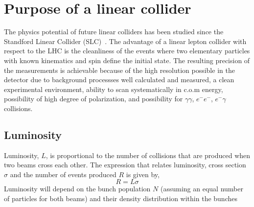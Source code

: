 \chapter{Purpose of a linear collider}
The physics potential of future linear colliders has been studied since the Standford Linear Collider (SLC)~\cite{Feldman88,SLC91}. The advantage of a linear lepton collider with respect to the LHC is the cleanliness of the events where two elementary particles with known kinematics and spin define the initial state. The resulting precision of the measurements is achievable because of the high resolution possible in the detector due to background processses well calculated and measured, a clean experimental environment, ability to scan systematically in c.o.m energy, possibility of high degree of polarization, and possibility for $\gamma\gamma$, $e^-e^-$, $e^-\gamma$ collisions.\par
\section{Luminosity}
Luminosity, $L$, is proportional to the number of collisions that are produced when two beams cross each other. The expression that relates luminosity, cross section $\sigma$ and the number of events produced $R$ is given by,
\begin{equation}
 R=L\sigma
\end{equation}
Luminosity will depend on the bunch population 	$N$ (assuming an equal number of particles for both beams) and their density distribution within the bunches 

